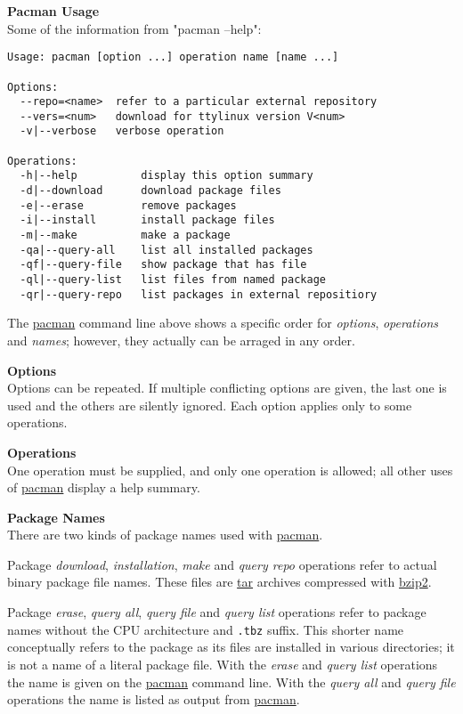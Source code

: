 \documentclass[10pt]{article}
\begin{document}
{\bf Pacman Usage}\\
Some of the information from "pacman --help":
\begin{lstlisting}
Usage: pacman [option ...] operation name [name ...]

Options:
  --repo=<name>  refer to a particular external repository
  --vers=<num>   download for ttylinux version V<num>
  -v|--verbose   verbose operation

Operations:
  -h|--help          display this option summary
  -d|--download      download package files
  -e|--erase         remove packages
  -i|--install       install package files
  -m|--make          make a package
  -qa|--query-all    list all installed packages
  -qf|--query-file   show package that has file
  -ql|--query-list   list files from named package
  -qr|--query-repo   list packages in external repositiory
\end{lstlisting}

The \url{pacman} command line above shows a specific order for {\it options},
{\it operations} and {\it names}; however, they actually can be arraged in any
order.

{\bf Options}\\
Options can be repeated. If multiple conflicting options are given, the last
one is used and the others are silently ignored. Each option applies only to
some operations.

{\bf Operations}\\
One operation must be supplied, and only one operation is allowed; all other
uses of \url{pacman} display a help summary.

{\bf Package Names}\\
There are two kinds of package names used with \url{pacman}.

Package {\it download}, {\it installation}, {\it make} and
{\it query repo} operations refer to actual binary package file names.
These files are \url{tar} archives compressed with \url{bzip2}.

Package {\it erase}, {\it query all}, {\it query file} and {\it query list}
operations refer to package names without the CPU architecture and {\tt .tbz}
suffix. This shorter name conceptually refers to the package as its files are
installed in various directories; it is not a name of a literal package file.
With the {\it erase} and {\it query list} operations the name is given on the
\url{pacman} command line. With the {\it query all} and {\it query file}
operations the name is listed as output from \url{pacman}.
\end{document}
